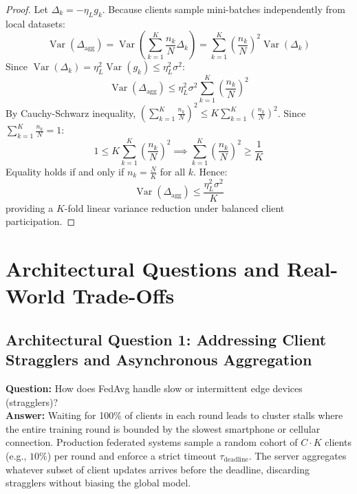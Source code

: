 \documentclass[11pt,a4paper]{article}
\theoremstyle{definition}
\begin{document}
\begin{proof}
Let $\Delta_k = -\eta_L g_k$. Because clients sample mini-batches independently from local datasets:
\begin{equation}
\operatorname{Var}\left( \Delta_{\text{agg}} \right) = \operatorname{Var}\left( \sum_{k=1}^K \frac{n_k}{N} \Delta_k \right) = \sum_{k=1}^K \left(\frac{n_k}{N}\right)^2 \operatorname{Var}(\Delta_k)
\end{equation}
Since $\operatorname{Var}(\Delta_k) = \eta_L^2 \operatorname{Var}(g_k) \le \eta_L^2 \sigma^2$:
\begin{equation}
\operatorname{Var}\left( \Delta_{\text{agg}} \right) \le \eta_L^2 \sigma^2 \sum_{k=1}^K \left(\frac{n_k}{N}\right)^2
\end{equation}
By Cauchy-Schwarz inequality, $\left(\sum_{k=1}^K \frac{n_k}{N}\right)^2 \le K \sum_{k=1}^K \left(\frac{n_k}{N}\right)^2$. Since $\sum_{k=1}^K \frac{n_k}{N} = 1$:
\begin{equation}
1 \le K \sum_{k=1}^K \left(\frac{n_k}{N}\right)^2 \implies \sum_{k=1}^K \left(\frac{n_k}{N}\right)^2 \ge \frac{1}{K}
\end{equation}
Equality holds if and only if $n_k = \frac{N}{K}$ for all $k$. Hence:
\begin{equation}
\operatorname{Var}\left( \Delta_{\text{agg}} \right) \le \frac{\eta_L^2 \sigma^2}{K}
\end{equation}
providing a $K$-fold linear variance reduction under balanced client participation.
\end{proof}

\section{Architectural Questions and Real-World Trade-Offs}

\subsection{Architectural Question 1: Addressing Client Stragglers and Asynchronous Aggregation}
\textbf{Question:} How does FedAvg handle slow or intermittent edge devices (stragglers)?\\
\textbf{Answer:} Waiting for 100\% of clients in each round leads to cluster stalls where the entire training round is bounded by the slowest smartphone or cellular connection. Production federated systems sample a random cohort of $C \cdot K$ clients (e.g., $10\%$) per round and enforce a strict timeout $\tau_{\text{deadline}}$. The server aggregates whatever subset of client updates arrives before the deadline, discarding stragglers without biasing the global model.
\end{document}
